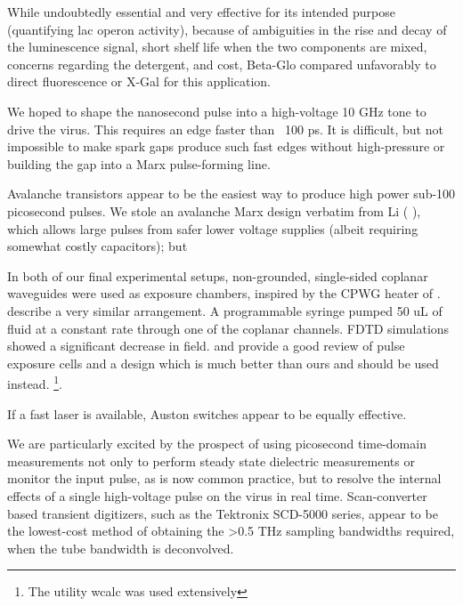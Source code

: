 \documentclass[paper.tex]{subfiles}
\begin{document}
While undoubtedly essential and very effective for its intended purpose (quantifying lac operon activity), because of ambiguities in the rise and decay of the luminescence signal, short shelf life when the two components are mixed, concerns regarding the detergent, and cost, Beta-Glo compared unfavorably to direct fluorescence or X-Gal for this application.


We hoped to shape the nanosecond pulse into a high-voltage 10 GHz tone to drive the virus. This requires an edge faster than ~100 ps. It is difficult, but not impossible\cite{Fundamental1998} to make spark gaps produce such fast edges without high-pressure\cite{Design2007d}\cite{Picosecond1993} or building the gap into a Marx\cite{Simple1991} pulse-forming line. 

Avalanche transistors appear to be the easiest way to produce high power sub-100 picosecond pulses. We stole an avalanche Marx design verbatim from Li (\cite{Development2016b} \cite{Design2018c}), which allows large pulses from safer lower voltage supplies (albeit requiring somewhat costly capacitors); but 

In both of our final experimental setups, non-grounded, single-sided coplanar waveguides were used as exposure chambers, inspired by the CPWG heater of \cite{Microwave2007}. \cite{Nanosecond2006} describe a very similar arrangement. A programmable syringe pumped 50 uL of fluid at a constant rate through one of the coplanar channels. FDTD simulations showed a significant decrease in field. \cite{Microchamber2011} and \cite{Characterization2012} provide a good review of pulse exposure cells and a design which is much better than ours and should be used instead. \cite{Electromagnetic1989} \footnote{The utility wcalc was used extensively}.

If a fast laser is available, Auston switches appear to be equally effective.

We are particularly excited by the prospect of using picosecond time-domain measurements not only to perform steady state dielectric measurements or monitor the input pulse, as is now common practice, but to resolve the internal effects of a single high-voltage pulse on the virus in real time. Scan-converter based transient digitizers, such as the Tektronix SCD-5000 series, appear to be the lowest-cost method of obtaining the >0.5 THz sampling bandwidths required, when the tube bandwidth is deconvolved.

\end{document}

